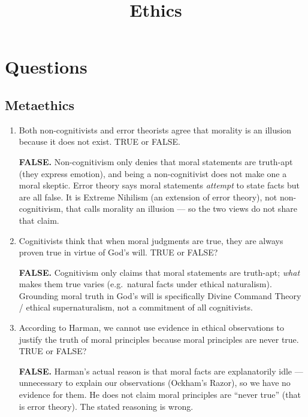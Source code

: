 \documentclass[12pt]{article}
\title{Ethics}
\date{}
\author{}
\begin{document}
\section{Questions}
\subsection{Metaethics}
\begin{enumerate}
    \item Both non-cognitivists and error theorists agree that morality is an illusion because it does not exist. TRUE or FALSE.
    \begin{answer}\textbf{FALSE.} Non-cognitivism only denies that moral statements are truth-apt (they express emotion), and being a non-cognitivist does not make one a moral skeptic. Error theory says moral statements \emph{attempt} to state facts but are all false. It is Extreme Nihilism (an extension of error theory), not non-cognitivism, that calls morality an illusion --- so the two views do not share that claim.\end{answer}
    \item Cognitivists think that when moral judgments are true, they are always proven true in virtue of God’s will. TRUE or FALSE?
    \begin{answer}\textbf{FALSE.} Cognitivism only claims that moral statements are truth-apt; \emph{what} makes them true varies (e.g.\ natural facts under ethical naturalism). Grounding moral truth in God’s will is specifically Divine Command Theory / ethical supernaturalism, not a commitment of all cognitivists.\end{answer}
    \item According to Harman, we cannot use evidence in ethical observations to justify the truth of moral principles because moral principles are never true. TRUE or FALSE?
    \begin{answer}\textbf{FALSE.} Harman’s actual reason is that moral facts are explanatorily idle --- unnecessary to explain our observations (Ockham’s Razor), so we have no evidence for them. He does not claim moral principles are ``never true'' (that is error theory). The stated reasoning is wrong.\end{answer}
\end{enumerate}
\end{document}
